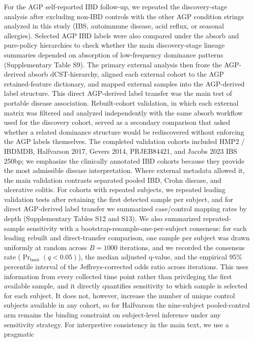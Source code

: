 \documentclass[
  11pt,
]{article}
\begin{document}
For the AGP self-reported IBD follow-up, we repeated the discovery-stage
analysis after excluding non-IBD controls with the other AGP condition
strings analyzed in this study (IBS, autoimmune disease, acid reflux, or
seasonal allergies). Selected AGP IBD labels were also compared under
the absorb and pure-policy hierarchies to check whether the main
discovery-stage lineage summaries depended on absorption of
low-frequency dominance patterns (Supplementary Table S9). The
primary external analysis then froze the AGP-derived absorb
dCST-hierarchy, aligned each external cohort to the AGP retained-feature
dictionary, and mapped external samples into the AGP-derived label
structure. This direct AGP-derived label transfer was the main test of
portable disease association. Rebuilt-cohort validation, in which each
external matrix was filtered and analyzed independently with the same
absorb workflow used for the discovery cohort, served as a secondary
comparison that asked whether a related dominance structure would be
rediscovered without enforcing the AGP labels themselves. The completed
validation cohorts included HMP2 / IBDMDB, Halfvarson 2017, Gevers 2014,
PRJEB84421, and Jacobs 2023 IBS 250bp; we emphasize the
clinically annotated IBD cohorts because they provide the most
admissible disease interpretation. Where external metadata allowed it,
the main validation contrasts separated pooled IBD, Crohn disease, and
ulcerative colitis. For cohorts with repeated subjects, we repeated
leading validation tests after retaining the first detected sample per
subject, and for direct AGP-derived label transfer we summarized
case/control mapping rates by depth (Supplementary Tables S12 and S13).
We also summarized repeated-sample sensitivity with a
bootstrap-resample-one-per-subject consensus: for each leading rebuilt
and direct-transfer comparison, one sample per subject was drawn
uniformly at random across \(B = 1000\) iterations, and we recorded the
consensus rate (\(\Pr_{\text{boot}}(q < 0.05)\)), the median adjusted
q-value, and the empirical 95\% percentile interval of the
Jeffreys-corrected odds ratio across iterations. This uses information
from every collected time point rather than privileging the first
available sample, and it directly quantifies sensitivity to which sample
is selected for each subject. It does not, however, increase the number
of unique control subjects available in any cohort, so for Halfvarson
the nine-subject pooled-control arm remains the binding constraint on
subject-level inference under any sensitivity strategy.
For interpretive consistency in the main text, we use a pragmatic
\end{document}
